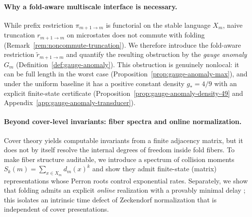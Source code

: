 \paragraph{Why a fold-aware multiscale interface is necessary.}
While prefix restriction $\pi_{m+1\to m}$ is functorial on the stable language $X_m$, naive truncation $r_{m+1\to m}$ on microstates does not commute with folding (Remark~\ref{rem:noncommute-truncation}).
We therefore introduce the fold-aware restriction $\widetilde r_{m+1\to m}$ and quantify the resulting obstruction by the \emph{gauge anomaly} $G_m$ (Definition~\ref{def:gauge-anomaly}).
This obstruction is genuinely nonlocal: it can be full length in the worst case (Proposition~\ref{prop:gauge-anomaly-max}), and under the uniform baseline it has a positive constant density $g_\ast=4/9$ with an explicit finite-state certificate (Proposition~\ref{prop:gauge-anomaly-density-49} and Appendix~\ref{app:gauge-anomaly-transducer}).

\paragraph{Beyond cover-level invariants: fiber spectra and online normalization.}
Cover theory yields computable invariants from a finite adjacency matrix, but it does not by itself resolve the internal degrees of freedom inside fold fibers.
To make fiber structure auditable, we introduce a spectrum of collision moments
\(
S_k(m)=\sum_{x\in X_m} d_m(x)^k
\)
and show they admit finite-state (matrix) representations whose Perron roots control exponential rates.
Separately, we show that folding admits an explicit \emph{online} realization with a provably minimal delay \cite{Frougny1999OnlineAddition}; this isolates an intrinsic time defect of Zeckendorf normalization that is independent of cover presentations.

